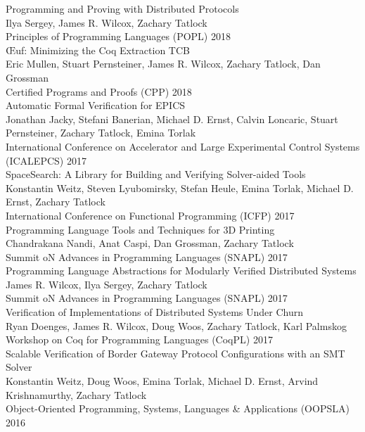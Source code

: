 \documentclass[10pt]{article}
\begin{document}
Programming and Proving with Distributed Protocols \\
Ilya Sergey, James R. Wilcox, Zachary Tatlock \\
Principles of Programming Languages (POPL) 2018 \\

Œuf: Minimizing the Coq Extraction TCB \\
Eric Mullen, Stuart Pernsteiner, James R. Wilcox, Zachary Tatlock, Dan Grossman \\
Certified Programs and Proofs (CPP) 2018 \\

Automatic Formal Verification for EPICS \\
Jonathan Jacky, Stefani Banerian, Michael D. Ernst, Calvin Loncaric, Stuart Pernsteiner, Zachary Tatlock, Emina Torlak \\
International Conference on Accelerator and Large Experimental Control Systems (ICALEPCS) 2017 \\

SpaceSearch: A Library for Building and Verifying Solver-aided Tools \\
Konstantin Weitz, Steven Lyubomirsky, Stefan Heule, Emina Torlak, Michael D. Ernst, Zachary Tatlock \\
International Conference on Functional Programming (ICFP) 2017 \\

Programming Language Tools and Techniques for 3D Printing \\
Chandrakana Nandi, Anat Caspi, Dan Grossman, Zachary Tatlock \\
Summit oN Advances in Programming Languages (SNAPL) 2017 \\

Programming Language Abstractions for Modularly Verified Distributed Systems \\
James R. Wilcox, Ilya Sergey, Zachary Tatlock \\
Summit oN Advances in Programming Languages (SNAPL) 2017 \\

Verification of Implementations of Distributed Systems Under Churn \\
Ryan Doenges, James R. Wilcox, Doug Woos, Zachary Tatlock, Karl Palmskog \\
Workshop on Coq for Programming Languages (CoqPL) 2017 \\

Scalable Verification of Border Gateway Protocol Configurations with an SMT Solver \\
Konstantin Weitz, Doug Woos, Emina Torlak, Michael D. Ernst, Arvind Krishnamurthy, Zachary Tatlock \\
Object-Oriented Programming, Systems, Languages \& Applications (OOPSLA) 2016 \\
\end{document}
